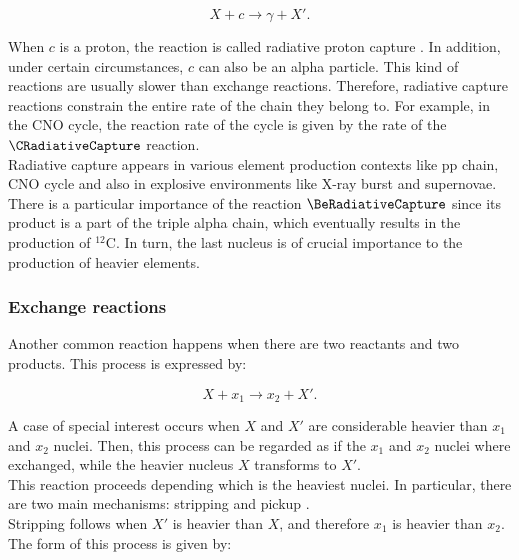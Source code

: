\documentclass[openany]{book}
\begin{document}
\begin{equation}  \label{eq:nuclearReaction_capture}
	X + c \rightarrow  \gamma + X'.
\end{equation}

When $c$ is a proton, the reaction is called radiative proton capture \cite{brune_davids_2015}. In addition, under certain circumstances, $c$ can also be an alpha particle. This kind of reactions are usually slower than exchange reactions. Therefore, radiative capture reactions constrain the entire rate of the chain they belong to. For example, in the CNO cycle, the reaction rate of the cycle is given by the rate of the $\CRadiativeCapture$ reaction. \\

Radiative capture appears in various element production contexts like pp chain, CNO cycle and also in explosive environments like X-ray burst and supernovae. There is a particular importance of the reaction $\BeRadiativeCapture$ since its product is a part of the triple alpha chain, which eventually results in the production of $\mathrm{{}^{12}C}$. In turn, the last nucleus is of crucial importance to the production of heavier elements. 

\subsubsection{Exchange reactions}  \label{ssub:exchangeReactions}

Another common reaction happens when there are two reactants and two products. This process is expressed by:

\begin{equation}  \label{eq:nuclearReaction_exchange}
	X +  x_1 \rightarrow x_2 + X'.
\end{equation}

A case of special interest occurs when $X$ and $X'$ are considerable heavier than $x_1$ and $x_2$ nuclei. Then, this process can be regarded as if the $x_1$ and $x_2$ nuclei where exchanged, while the heavier nucleus $X$ transforms to $X'$. \\

This reaction proceeds depending which is the heaviest nuclei. In particular, there are two main mechanisms: stripping and pickup \cite{xu_takahashi_goriely_arnould_ohta_utsunomiya_2013}.\\ 

Stripping follows when $X'$ is heavier than $X$, and therefore $x_1$ is heavier than $x_2$. The form of this process is given by:
\end{document}
